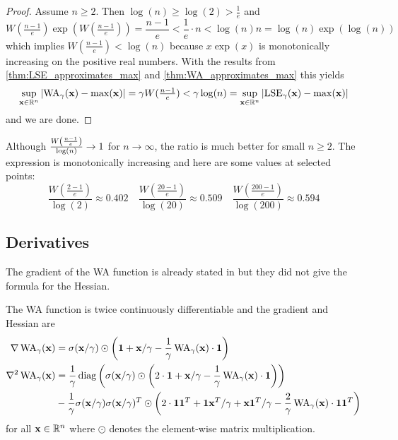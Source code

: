 \begin{proof}
 Assume \(n \geq 2\). Then \(\log(n) \geq \log(2) > \frac{1}{e}\) and
 \[ W(\tfrac{n-1}{e}) \exp(W(\tfrac{n-1}{e})) = \frac{n-1}{e} < \frac{1}{e} \cdot n < \log(n) n = \log(n) \exp(\log(n))\]
 which implies \(W(\tfrac{n-1}{e}) < \log(n)\) because \(x \exp(x)\) is monotonically increasing on the positive real numbers.
 With the results from \cref{thm:LSE_approximates_max} and \cref{thm:WA_approximates_max} this yields
 \[ \sup_{\mathbf{x} \in \mathbb{R}^n} \left\lvert \operatorname{WA}_\gamma(\mathbf{x}) - \max(\mathbf{x}) \right\rvert = \gamma W(\tfrac{n-1}{e}) < \gamma \log(n) = \sup_{\mathbf{x} \in \mathbb{R}^n} \left\lvert \operatorname{LSE}_\gamma(\mathbf{x}) - \max(\mathbf{x}) \right\rvert \]
 and we are done.
\end{proof}


\begin{remark}
 Although \(\frac{W \left({\frac{n-1}{e}}\right)}{\log(n)} \to 1\) for \(n \to \infty\), the ratio is much better for small \(n \geq 2\).
 The expression is monotonically increasing and here are some values at selected points:
 \[ \frac{W(\tfrac{2-1}{e})}{\log(2)} \approx 0.402 \quad \frac{W(\tfrac{20-1}{e})}{\log(20)} \approx 0.509 \quad \frac{W(\tfrac{200-1}{e})}{\log(200)} \approx 0.594\]
\end{remark}



\subsection{Derivatives} \label{sec:WA_derivatives}

The gradient of the WA function is already stated in \cite[Eq. 14]{LangeZuehlkeHolzVillmann-SmoothMaximum}
but they did not give the formula for the Hessian.

\begin{theorem} \label{thm:WA_derivatives}
 The WA function is twice continuously differentiable and the gradient and Hessian are
 \begin{align*}
  \nabla \operatorname{WA}_\gamma (\mathbf{x})   &= \sigma(\mathbf{x}/\gamma) \odot \left({ \mathbf{1} + \mathbf{x}/\gamma - \frac{1}{\gamma} \operatorname{WA}_\gamma(\mathbf{x}) \cdot \mathbf{1} }\right) \\
  \nabla^2 \operatorname{WA}_\gamma (\mathbf{x}) &= \frac{1}{\gamma} \operatorname{diag} \left({ \sigma(\mathbf{x}/\gamma) \odot \left({ 2 \cdot \mathbf{1} + \mathbf{x}/\gamma - \frac{1}{\gamma} \operatorname{WA}_\gamma(\mathbf{x}) \cdot \mathbf{1} }\right) }\right) \\
                                   &- \frac{1}{\gamma} \sigma(\mathbf{x}/\gamma) \sigma(\mathbf{x}/\gamma)^T \odot \left({ 2 \cdot \mathbf{1} \mathbf{1}^T + \mathbf{1} \mathbf{x}^T / \gamma + \mathbf{x} \mathbf{1}^T / \gamma - \frac{2}{\gamma} \operatorname{WA}_\gamma(\mathbf{x}) \cdot \mathbf{1} \mathbf{1}^T }\right)
 \end{align*}
 for all \(\mathbf{x} \in \mathbb{R}^n\) where \(\odot\) denotes the element-wise matrix multiplication.
\end{theorem}

